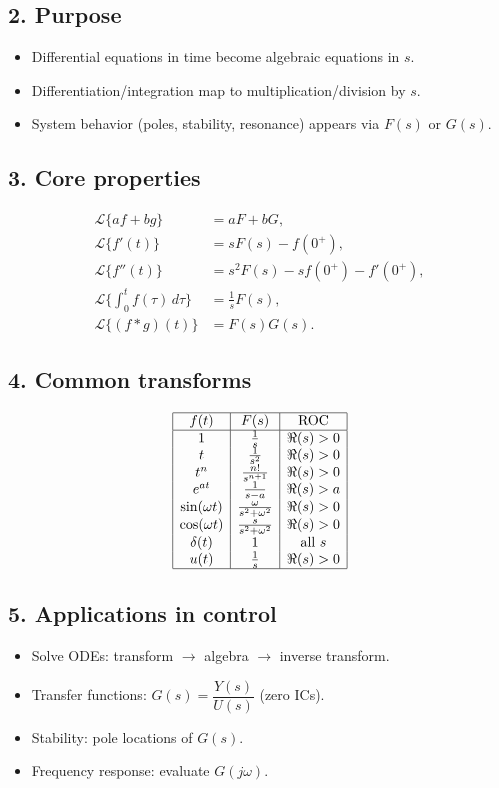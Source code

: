 \documentclass[12pt,a4paper]{article}
\begin{document}
	\subsection*{2. Purpose}
	\begin{itemize}
		\item Differential equations in time become algebraic equations in $s$.
		\item Differentiation/integration map to multiplication/division by $s$.
		\item System behavior (poles, stability, resonance) appears via $F(s)$ or $G(s)$.
	\end{itemize}
	
	\subsection*{3. Core properties}
	\begin{align*}
		\mathcal{L}\{af+bg\} &= aF + bG, \\
		\mathcal{L}\{f'(t)\} &= sF(s) - f(0^+), \\
		\mathcal{L}\{f''(t)\} &= s^2F(s) - s f(0^+) - f'(0^+), \\
		\mathcal{L}\Big\{\int_0^t f(\tau)\,d\tau\Big\} &= \frac{1}{s}F(s), \\
		\mathcal{L}\{(f*g)(t)\} &= F(s)G(s).
	\end{align*}
	
	\subsection*{4. Common transforms}
	\[
	\begin{array}{|c|c|c|}
		\hline
		f(t) & F(s) & \text{ROC} \\
		\hline
		1 & \tfrac{1}{s} & \Re(s)>0 \\
		t & \tfrac{1}{s^2} & \Re(s)>0 \\
		t^n & \tfrac{n!}{s^{n+1}} & \Re(s)>0 \\
		e^{at} & \tfrac{1}{s-a} & \Re(s)>a \\
		\sin(\omega t) & \tfrac{\omega}{s^2+\omega^2} & \Re(s)>0 \\
		\cos(\omega t) & \tfrac{s}{s^2+\omega^2} & \Re(s)>0 \\
		\delta(t) & 1 & \text{all } s \\
		u(t) & \tfrac{1}{s} & \Re(s)>0 \\
		\hline
	\end{array}
	\]
	
	\subsection*{5. Applications in control}
	\begin{itemize}
		\item Solve ODEs: transform $\to$ algebra $\to$ inverse transform.
		\item Transfer functions: $G(s) = \dfrac{Y(s)}{U(s)}$ (zero ICs).
		\item Stability: pole locations of $G(s)$.
		\item Frequency response: evaluate $G(j\omega)$.
	\end{itemize}
	
\end{document}
